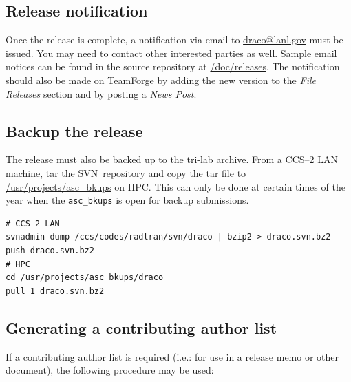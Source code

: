\documentclass[note]{newmemo}
\newcommand{\svn}{\textsf{SVN}}
\begin{document}

\subsection{Release notification}
\label{sec:release_notification}

Once the release is complete, a notification via email to
\url{draco@lanl.gov} must be issued.  You may need to contact other
interested parties as well.  Sample email notices can be found in the
source repository at \url{/doc/releases}.  The notification should
also be made on TeamForge by adding the new version to the
\textit{File Releases} section and by posting a \textit{News Post}.


\subsection{Backup the release}
\label{sec:backup_rel}

The release must also be backed up to the tri-lab archive.  From a
CCS--2 LAN machine, tar the \svn\ repository and copy the tar file to
\url{/usr/projects/asc\_bkups} on HPC.  This can only be done at
certain times of the year when the \texttt{asc\_bkups} is open for
backup submissions. 
\begin{lstlisting}[basicstyle=\footnotesize, xleftmargin=1.0in, 
  xrightmargin=1.00in]
# CCS-2 LAN
svnadmin dump /ccs/codes/radtran/svn/draco | bzip2 > draco.svn.bz2
push draco.svn.bz2
# HPC
cd /usr/projects/asc_bkups/draco
pull 1 draco.svn.bz2
\end{lstlisting}


\subsection{Generating a contributing author list}
\label{sec:author_list}

If a contributing author list is required (i.e.: for use in a release
memo or other document), the following procedure may be used:
\end{document}
